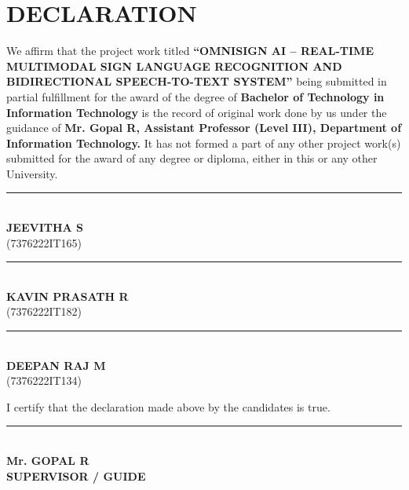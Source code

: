 \documentclass[12pt,a4paper]{report}
\begin{document}
\chapter*{DECLARATION} \label{chap:decl}
\thispagestyle{plain}
\vspace{0.2cm}
\noindent We affirm that the project work titled \textbf{``OMNISIGN AI -- REAL-TIME MULTIMODAL SIGN LANGUAGE RECOGNITION AND BIDIRECTIONAL SPEECH-TO-TEXT SYSTEM''} being submitted in partial fulfillment for the award of the degree of \textbf{Bachelor of Technology in Information Technology} is the record of original work done by us under the guidance of \textbf{Mr. Gopal R, Assistant Professor (Level III), Department of Information Technology.} It has not formed a part of any other project work(s) submitted for the award of any degree or diploma, either in this or any other University.
\vfill
\noindent
\begin{minipage}[t]{0.32\textwidth}
\centering
\rule{0.92\linewidth}{0.4pt}\\[4pt]
\textbf{JEEVITHA S}\\[2pt]
(7376222IT165)
\end{minipage}
\hfill
\begin{minipage}[t]{0.32\textwidth}
\centering
\rule{0.92\linewidth}{0.4pt}\\[4pt]
\textbf{KAVIN PRASATH R}\\[2pt]
(7376222IT182)
\end{minipage}
\hfill
\begin{minipage}[t]{0.32\textwidth}
\centering
\rule{0.92\linewidth}{0.4pt}\\[4pt]
\textbf{DEEPAN RAJ M}\\[2pt]
(7376222IT134)
\end{minipage}
\vfill
\noindent I certify that the declaration made above by the candidates is true.
\vfill
\noindent\hfill
\begin{minipage}[t]{0.48\textwidth}
\begin{flushright}
\rule{0.8\linewidth}{0.4pt}\\[4pt]
\textbf{Mr. GOPAL R}\\[2pt]
\textbf{SUPERVISOR / GUIDE}
\end{flushright}
\end{minipage}
\clearpage

\end{document}
